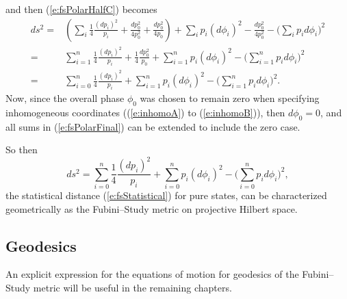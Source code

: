 and then (\ref{e:fsPolarHalfC}) becomes
\begin{equation}
\begin{split}
ds^2 =& 
    \left(
        \sum_i\frac{1}{4}\frac{(dp_i)^2}{p_i}
        + \frac{dp_0^2}{4p_0^2}
        + \frac{dp_0^2}{4p_0}
    \right)
    + \sum_i p_i\left(d\phi_i\right)^2
    - \frac{dp_0^2}{4p_0^2}
    - \biggl(\sum_i p_id\phi_i\biggr)^2\\
  =& 
    \sum_{i=1}^n\frac{1}{4}\frac{(dp_i)^2}{p_i}
    + \frac{1}{4}\frac{dp_0^2}{p_0}
    + \sum_{i=1}^n p_i\left(d\phi_i\right)^2
    - \biggl(\sum_{i=1}^n p_id\phi_i\biggr)^2\\
  =& 
    \sum_{i=0}^n\frac{1}{4}\frac{(dp_i)^2}{p_i}
    + \sum_{i=1}^n p_i\left(d\phi_i\right)^2
    - \biggl(\sum_{i=1}^n p_id\phi_i\biggr)^2.
\end{split}
\label{e:fsPolarFinal}
\end{equation}
Now, since the overall phase $\phi_0$ was chosen to remain 
zero when specifying inhomogeneous coordinates ((\ref{e:inhomoA})
to (\ref{e:inhomoB})), then $d\phi_0 = 0$, and all sums in 
(\ref{e:fsPolarFinal}) can be extended to include the zero case.

So then
\begin{equation}
ds^2 = \sum_{i=0}^n\frac{1}{4}\frac{(dp_i)^2}{p_i}
    + \sum_{i=0}^n p_i\left(d\phi_i\right)^2
    - \biggl(\sum_{i=0}^n p_id\phi_i\biggr)^2,
\end{equation}
the statistical distance (\ref{e:fsStatistical}) for pure states,
can be characterized geometrically as the Fubini--Study metric on
projective Hilbert space.

\subsection{Geodesics}

An explicit expression for the equations of motion 
for geodesics of the Fubini--Study metric will be useful
in the remaining chapters. 

